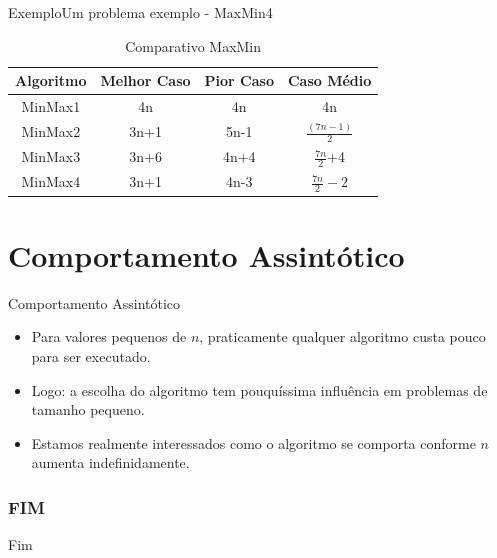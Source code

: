 \documentclass[aspectratio=169]{beamer}
\begin{document}

\begin{frame}{Exemplo}{Um problema exemplo - MaxMin4}
\begin{table}[]
\centering
\caption{Comparativo MaxMin}
\label{Comparativo2 MaxMin}
\begin{tabular}{c|ccc}
Algoritmo  &  Melhor Caso  &  Pior Caso  &  Caso Médio  \\
\hline
MinMax1  &   4n       &       4n   &  4n \\
MinMax2  &   3n+1     &       5n-1   &  $\frac{(7n -1)}{2}$ \\
MinMax3  &   3n+6     & 4n+4    &  $\frac{7n}{2}$+4 \\
MinMax4  &   3n+1     &      4n-3 &  $\frac{7n}{2}-2$ \\
\end{tabular}
\end{table}
\end{frame}

\section{Comportamento Assintótico}

\begin{frame}{Comportamento Assintótico}
\begin{itemize}
 \item Para valores pequenos de $n$, praticamente qualquer algoritmo custa pouco para ser executado.
 \item Logo: a escolha do algoritmo tem pouquíssima influência em problemas de tamanho pequeno.
 \item Estamos realmente interessados como o algoritmo se comporta conforme $n$ aumenta indefinidamente.
\end{itemize}
\end{frame}


\begin{frame}
  \frametitle{FIM}
\centering
\alert{Fim}
\end{frame}	


\begin{frame}[plain]
  \titlepage
\end{frame}

\end{document}
